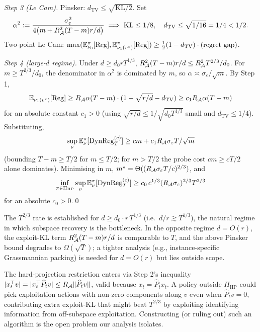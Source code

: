 \emph{Step 3 (Le Cam).} Pinsker: $d_{\mathrm{TV}}\le\sqrt{\mathrm{KL}/2}$.
Set
\[
\alpha^2 := \frac{\sigma_\varepsilon^2}{4\bigl(m+R_{\mathcal{A}}^2(T-m)r/d\bigr)}
\implies\mathrm{KL}\le 1/8,\quad d_{\mathrm{TV}}\le\sqrt{1/16}=1/4 < 1/2.
\]
Two-point Le Cam:
$\max(\mathbb{E}^\pi_{\nu_0}[\mathrm{Reg}],\mathbb{E}^\pi_{\nu_1(v^\star)}[\mathrm{Reg}])
\ge\tfrac12(1-d_{\mathrm{TV}})\cdot(\text{regret gap})$.

\emph{Step 4 (large-$d$ regime).} Under $d\ge d_0 r T^{1/3}$,
$R_{\mathcal{A}}^2(T-m)r/d\le R_{\mathcal{A}}^2 T^{2/3}/d_0$. For $m\ge T^{2/3}/d_0$, the
denominator in $\alpha^2$ is dominated by $m$, so
$\alpha\asymp\sigma_\varepsilon/\sqrt m$. By Step 1,
\[
\mathbb{E}_{\nu_1(v^\star)}[\mathrm{Reg}]
\ge R_{\mathcal{A}}\alpha(T-m)\cdot(1-\sqrt{r/d}-d_{\mathrm{TV}})
\ge c_1 R_{\mathcal{A}}\alpha(T-m)
\]
for an absolute constant $c_1>0$ (using $\sqrt{r/d}\le 1/\sqrt{d_0 T^{1/3}}$
small and $d_{\mathrm{TV}}\le 1/4$). Substituting,
\[
\sup_\nu\mathbb{E}^\pi_\nu[\mathrm{DynReg}_T^{(c)}]
\ge cm+c_1 R_{\mathcal{A}}\sigma_\varepsilon T/\sqrt m
\]
(bounding $T-m\ge T/2$ for $m\le T/2$; for $m>T/2$ the probe cost
$cm\ge cT/2$ alone dominates). Minimising in $m$,
$m^\star=\Theta((R_{\mathcal{A}}\sigma_\varepsilon T/c)^{2/3})$, and
\[
\inf_{\pi\in\Pi_{\mathrm{HP}}}\sup_\nu\mathbb{E}^\pi_\nu[\mathrm{DynReg}_T^{(c)}]
\ge c_0\,c^{1/3}(R_{\mathcal{A}}\sigma_\varepsilon)^{2/3}T^{2/3}
\]
for an absolute $c_0>0$.\qed

\begin{remark}
\label{rem:lb_scope_conf}
The $T^{2/3}$ rate is established for $d\ge d_0\cdot r\,T^{1/3}$
(i.e.\ $d/r\gtrsim T^{1/3}$), the natural regime in which subspace
recovery is the bottleneck. In the opposite regime $d=O(r)$, the
exploit-KL term $R_{\mathcal{A}}^2(T-m)r/d$ is comparable to $T$, and the above
Pinsker bound degrades to $\Omega(\sqrt T)$; a tighter analysis
(e.g., instance-specific Grassmannian packing) is needed for
$d=O(r)$ but lies outside scope.
\end{remark}

\begin{remark}
\label{rem:lb_class_conf}
The hard-projection restriction enters via Step 2's inequality
$|x_t^\top v|=|x_t^\top\widehat P_t v|\le R_{\mathcal{A}}\|\widehat P_t v\|$,
valid because $x_t=\widehat P_t x_t$. A policy outside
$\Pi_{\mathrm{HP}}$ could pick exploitation actions with non-zero
components along $v$ even when $\widehat P_t v=0$, contributing extra
exploit-KL that might beat $T^{2/3}$ by exploiting identifying
information from off-subspace exploitation. Constructing (or ruling
out) such an algorithm is the open problem our analysis isolates.
\end{remark}


